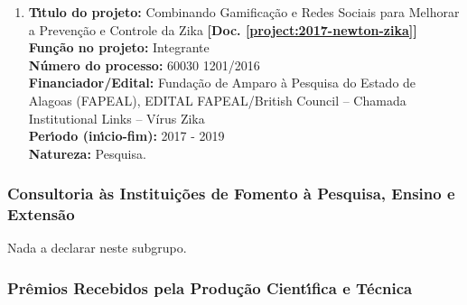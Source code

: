 \documentclass[a4paper,oneside,10pt]{article}
\begin{document}
\begin{enumerate}
\item \textbf{T\'{\i}tulo do projeto:} Combinando Gamificação e Redes Sociais para Melhorar a Prevenção e Controle da Zika \textbf{[Doc. \ref{project:2017-newton-zika}]}\\
      \textbf{Fun\c{c}\~{a}o no projeto:} Integrante\\
      \textbf{N\'{u}mero do processo:} 60030 1201/2016\\
      \textbf{Financiador/Edital:} Fundação de Amparo à Pesquisa do Estado de Alagoas (FAPEAL), EDITAL FAPEAL/British Council – Chamada Institutional Links – Vírus Zika\\
      \textbf{Per\'{\i}odo (in\'{\i}cio-fim):} 2017 - 2019\\
      \textbf{Natureza:} Pesquisa.

\end{enumerate}


\subsubsection{Consultoria \`{a}s Institui\c{c}\~{o}es de Fomento \`{a} Pesquisa, Ensino e Extens\~{a}o}
\vspace{0.3cm}

Nada a declarar neste subgrupo.






\subsubsection{Pr\^{e}mios Recebidos pela Produ\c{c}\~{a}o Cient\'{\i}fica e T\'{e}cnica}
\vspace{0.3cm}
\end{document}
